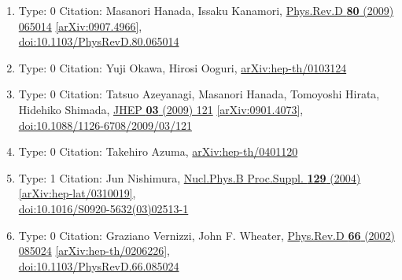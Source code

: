 \documentclass[a4paper,10pt]{article}
\begin{document}
\begin{enumerate}
\begin{enumerate}
  \item Type: 0 Citation: Masanori Hanada, Issaku Kanamori, \href{https://www.doi.org/10.1103/PhysRevD.80.065014}{Phys.Rev.D {\bf 80} (2009) 065014}  \href{https://arxiv.org/abs/0907.4966}{[arXiv:0907.4966]},\\\href{https://www.doi.org/10.1103/PhysRevD.80.065014}{doi:10.1103/PhysRevD.80.065014}
  \item Type: 0 Citation: Yuji Okawa, Hirosi Ooguri, \href{https://arxiv.org/abs/hep-th/0103124}{arXiv:hep-th/0103124}
  \item Type: 0 Citation: Tatsuo Azeyanagi, Masanori Hanada, Tomoyoshi Hirata, Hidehiko Shimada, \href{https://www.doi.org/10.1088/1126-6708/2009/03/121}{JHEP {\bf 03} (2009) 121}  \href{https://arxiv.org/abs/0901.4073}{[arXiv:0901.4073]},\\\href{https://www.doi.org/10.1088/1126-6708/2009/03/121}{doi:10.1088/1126-6708/2009/03/121}
  \item Type: 0 Citation: Takehiro Azuma, \href{https://arxiv.org/abs/hep-th/0401120}{arXiv:hep-th/0401120}
  \item Type: 1 Citation: Jun Nishimura, \href{https://www.doi.org/10.1016/S0920-5632(03)02513-1}{Nucl.Phys.B Proc.Suppl. {\bf 129} (2004) }  \href{https://arxiv.org/abs/hep-lat/0310019}{[arXiv:hep-lat/0310019]},\\\href{https://www.doi.org/10.1016/S0920-5632(03)02513-1}{doi:10.1016/S0920-5632(03)02513-1}
  \item Type: 0 Citation: Graziano Vernizzi, John F. Wheater, \href{https://www.doi.org/10.1103/PhysRevD.66.085024}{Phys.Rev.D {\bf 66} (2002) 085024}  \href{https://arxiv.org/abs/hep-th/0206226}{[arXiv:hep-th/0206226]},\\\href{https://www.doi.org/10.1103/PhysRevD.66.085024}{doi:10.1103/PhysRevD.66.085024}

\end{enumerate}
\end{enumerate}
\end{document}
